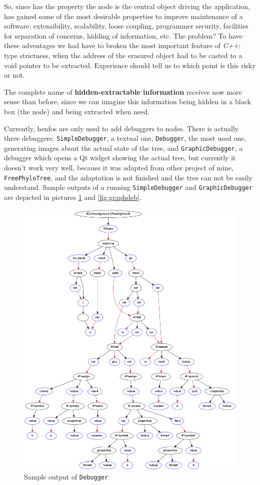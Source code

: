 \documentclass{article}
\begin{document}
So, since \fav has the property the node is the central object driving the
application, \fav has gained some of the most desirable properties to improve
maintenance of a software: extensibility, scalability, loose coupling,
programmer security, facilities for separation of concerns, hidding of
information, etc. The problem? To have these adventages we had have to broken
the most important feature of \textit{C++}: type strictness, when the address of
the erasured object had to be casted to a void pointer to be
extracted. Experience should tell us to which point is this risky or not.

The complete name of \textbf{hidden-extractable information} receives now more
sense than before, since we can imagine this information being hidden in a black
box (the node) and being extracted when need.

Currently, henfos are only used to add debuggers to nodes. There is actually
three debuggers: \texttt{SimpleDebugger}, a textual one, \texttt{Debugger}, the
most used one, generating images about the actual state of the tree, and
\texttt{GraphicDebugger}, a debugger which opens a Qt widget showing the actual
tree, but currently it doesn't work very well, because it was adapted from other
project of mine, \texttt{FreePhyloTree}, and the adaptation is not finished and
the tree can not be easily understand. Sample outputs of a running
\texttt{SimpleDebugger} and \texttt{GraphicDebugger} are depicted in pictures
\ref{fig:deb} and \ref{fig:graphdeb}.

\begin{figure}[h!]
  \centering
  \includegraphics[scale=0.25]{Debugger-out-6.png}
  \caption{Sample output of \texttt{Debugger}}
  \label{fig:deb}
\end{figure}
\end{document}
